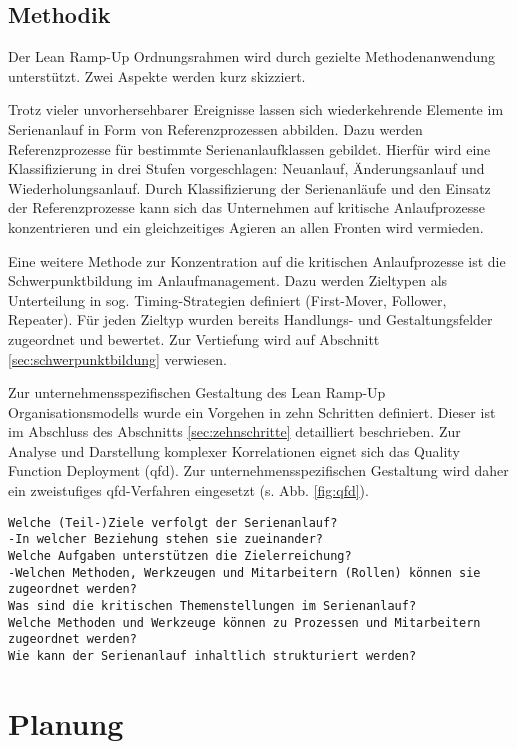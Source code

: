 \subsection*{Methodik}
Der Lean Ramp-Up Ordnungsrahmen wird durch gezielte Methodenanwendung unterstützt. Zwei Aspekte werden kurz skizziert. 

Trotz vieler unvorhersehbarer Ereignisse lassen sich wiederkehrende Elemente im Serienanlauf in Form von Referenzprozessen abbilden. %
Dazu werden Referenzprozesse für bestimmte Serienanlaufklassen gebildet. Hierfür wird eine Klassifizierung in drei Stufen vorgeschlagen: Neuanlauf, Änderungsanlauf und Wiederholungsanlauf. 
Durch Klassifizierung der Serienanläufe und den Einsatz der Referenzprozesse kann sich das Unternehmen auf kritische Anlaufprozesse konzentrieren und ein gleichzeitiges Agieren an allen Fronten wird vermieden.

Eine weitere Methode zur Konzentration auf die kritischen Anlaufprozesse ist die Schwerpunktbildung im Anlaufmanagement. Dazu werden Zieltypen als Unterteilung in sog. Timing-Strategien definiert (First-Mover, Follower, Repeater). Für jeden Zieltyp wurden bereits Handlungs- und Gestaltungsfelder zugeordnet und bewertet. Zur Vertiefung wird auf Abschnitt \ref{sec:schwerpunktbildung} verwiesen. 

Zur unternehmensspezifischen Gestaltung des Lean Ramp-Up Organisationsmodells wurde ein Vorgehen in zehn Schritten definiert. Dieser ist im Abschluss des Abschnitts \ref{sec:zehnschritte} detailliert beschrieben. Zur Analyse und Darstellung komplexer Korrelationen eignet sich das Quality Function Deployment (\gls{qfd}). Zur unternehmensspezifischen Gestaltung wird daher ein zweistufiges \gls{qfd}-Verfahren eingesetzt (s. Abb. \ref{fig:qfd}). 

\begin{verbatim}
Welche (Teil-)Ziele verfolgt der Serienanlauf? 
-In welcher Beziehung stehen sie zueinander? 
Welche Aufgaben unterstützen die Zielerreichung? 
-Welchen Methoden, Werkzeugen und Mitarbeitern (Rollen) können sie zugeordnet werden?
Was sind die kritischen Themenstellungen im Serienanlauf?
Welche Methoden und Werkzeuge können zu Prozessen und Mitarbeitern 
zugeordnet werden? 
Wie kann der Serienanlauf inhaltlich strukturiert werden? 
\end{verbatim}


\section{Planung}

